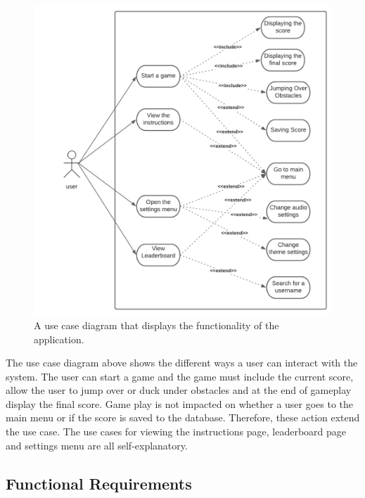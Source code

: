 \documentclass[12pt]{article}
\begin{document}
\begin{figure}[H]
    \centering
    \includegraphics[scale=1.4]{use_case.png}
    \caption{A use case diagram that displays the functionality of the application.}
\end{figure}

The use case diagram above shows the different ways a user can interact with the system. The user can start a game and the game must include the current score, allow the user to jump over or duck under obstacles and at the end of gameplay display the final score. Game play is not impacted on whether a user goes to the main menu or if the score is saved to the database. Therefore, these action extend the use case. The use cases for viewing the instructions page, leaderboard page and settings menu are all self-explanatory. 



\subsection{Functional Requirements}
\end{document}
